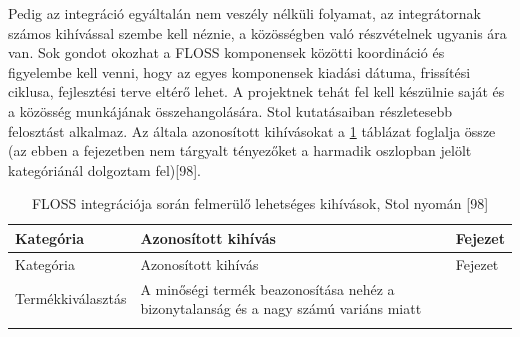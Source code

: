 \documentclass[12pt,magyar,a4paper,oneside]{scrreprt}
\begin{document}
Pedig az integráció egyáltalán nem veszély nélküli folyamat, az
integrátornak számos kihívással szembe kell néznie, a közösségben való
részvételnek ugyanis ára van. Sok gondot okozhat a FLOSS komponensek
közötti koordináció és figyelembe kell venni, hogy az egyes komponensek
kiadási dátuma, frissítési ciklusa, fejlesztési terve eltérő lehet. A
projektnek tehát fel kell készülnie saját és a közösség munkájának
összehangolására. Stol kutatásaiban részletesebb felosztást alkalmaz. Az
általa azonosított kihívásokat a \ref{tbl:IntKih} táblázat foglalja
össze (az ebben a fejezetben nem tárgyalt tényezőket a harmadik
oszlopban jelölt kategóriánál dolgoztam fel){[}98{]}.

\hypertarget{tbl:IntKih}{}
\begin{longtable}[]{@{}lll@{}}
\caption{\label{tbl:IntKih}FLOSS integrációja során felmerülő lehetséges
kihívások, Stol nyomán {[}98{]}}\tabularnewline
\toprule
\begin{minipage}[b]{0.24\columnwidth}\raggedright
Kategória\strut
\end{minipage} & \begin{minipage}[b]{0.49\columnwidth}\raggedright
Azonosított kihívás\strut
\end{minipage} & \begin{minipage}[b]{0.18\columnwidth}\raggedright
Fejezet\strut
\end{minipage}\tabularnewline
\midrule
\endfirsthead
\toprule
\begin{minipage}[b]{0.24\columnwidth}\raggedright
Kategória\strut
\end{minipage} & \begin{minipage}[b]{0.49\columnwidth}\raggedright
Azonosított kihívás\strut
\end{minipage} & \begin{minipage}[b]{0.18\columnwidth}\raggedright
Fejezet\strut
\end{minipage}\tabularnewline
\midrule
\endhead
\begin{minipage}[t]{0.24\columnwidth}\raggedright
Termékkiválasztás\strut
\end{minipage} & \begin{minipage}[t]{0.49\columnwidth}\raggedright
A minőségi termék beazonosítása nehéz a bizonytalanság és a nagy számú
variáns miatt\strut
\end{minipage} & \begin{minipage}[t]{0.18\columnwidth}\raggedright
\strut
\end{minipage}\tabularnewline
\begin{minipage}[t]{0.24\columnwidth}\raggedright

\end{minipage}
\end{longtable}
\end{document}
